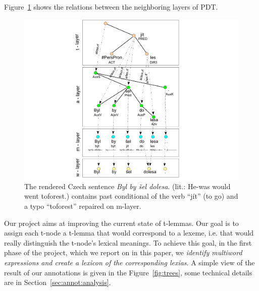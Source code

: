 Figure~\ref{fig:layers} shows the relations between the neighboring layers of PDT. 
\begin{figure}[htbp]
   \centering
   \includegraphics[scale=.38]{images/roviny.pdf} %
   \caption{The rendered Czech sentence \emph{Byl by šel dolesa}. (lit.: He-was would went toforest.) contains past conditional of the verb ``jít'' (to go) and a typo ``toforest'' repaired on m-layer.}
   \label{fig:layers}
\end{figure}

Our project aims at improving the current state of t-lemmas. Our goal is to assign each t-node a t-lemma that would correspond to a lexeme, i.e. that would really distinguish the t-node's lexical meanings. To achieve this goal, in the first phase of the project, which we report on in this paper, we \emph{identify multiword expressions and create a lexicon of the corresponding lexias}. A simple view of the result of our annotations is given in the Figure~\ref{fig:trees}, some technical details are in Section~\ref{sec:annot:analysis}.



